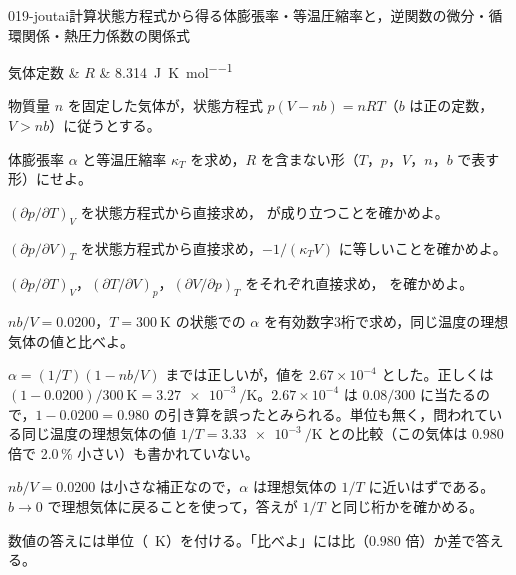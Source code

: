 \documentclass[uplatex,dvipdfmx,a4paper,11pt]{jsarticle}
\begin{document}
\begin{mondai}{019-joutai}{計算}{状態方程式から得る体膨張率・等温圧縮率と，逆関数の微分・循環関係・熱圧力係数の関係式}
\begin{teisuu}
  気体定数 & $R$ & \qty{8.314}{\joule\per\kelvin\per\mole}\\
\end{teisuu}
物質量 $n$ を固定した気体が，状態方程式 $p(V - nb) = nRT$（$b$ は正の定数，$V > nb$）に従うとする。
  \begin{shoumon}
    \item 体膨張率 $\alpha$ と等温圧縮率 $\kappa_{T}$ を求め，$R$ を含まない形（$T$，$p$，$V$，$n$，$b$ で表す形）にせよ。
    \item $(\partial p/\partial T)_{V}$ を状態方程式から直接求め， が成り立つことを確かめよ。
    \item $(\partial p/\partial V)_{T}$ を状態方程式から直接求め，$-1/(\kappa_{T}V)$ に等しいことを確かめよ。
    \item $(\partial p/\partial T)_{V}$，$(\partial T/\partial V)_{p}$，$(\partial V/\partial p)_{T}$ をそれぞれ直接求め， を確かめよ。
    \item $nb/V = 0.0200$，$T = \qty{300}{\kelvin}$ の状態での $\alpha$ を有効数字3桁で求め，同じ温度の理想気体の値と比べよ。
  \end{shoumon}

\begin{kotaeran}
   $\alpha=(1/T)(1-nb/V)$ までは正しいが，値を $2.67\times10^{-4}$ とした。正しくは $(1-0.0200)/\qty{300}{\kelvin}=\qty{3.27e-3}{\per\kelvin}$。$2.67\times10^{-4}$ は $0.08/300$ に当たるので，$1-0.0200=0.980$ の引き算を誤ったとみられる。単位も無く，問われている同じ温度の理想気体の値 $1/T=\qty{3.33e-3}{\per\kelvin}$ との比較（この気体は $0.980$ 倍で 2.0\,\% 小さい）も書かれていない。
\end{kotaeran}
\begin{rikai}
  \item $nb/V=0.0200$ は小さな補正なので，$\alpha$ は理想気体の $1/T$ に近いはずである。$b\to0$ で理想気体に戻ることを使って，答えが $1/T$ と同じ桁かを確かめる。
  \item 数値の答えには単位（\unit{\per\kelvin}）を付ける。「比べよ」には比（$0.980$ 倍）か差で答える。
\end{rikai}
\end{mondai}
\end{document}
